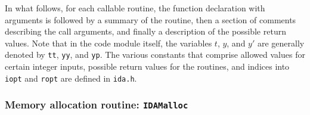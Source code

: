 \documentclass[11pt]{article}
\begin{document}
In what follows, for each callable routine, the function declaration
with arguments is followed by a summary of the routine, then a section
of comments describing the call arguments, and finally a description
of the possible return values.  Note that in the code module itself,
the variables $t$, $y$, and $y'$ are generally denoted by {\tt tt},
{\tt yy}, and {\tt yp}.  The various constants that comprise allowed
values for certain integer inputs, possible return values for the
routines, and indices into {\tt iopt} and {\tt ropt} are defined in
{\tt ida.h}.


\subsubsection{Memory allocation routine: {\tt IDAMalloc}}
\end{document}
